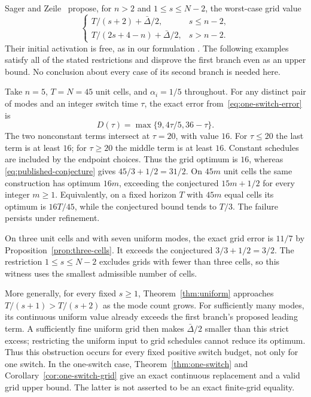 Sager and Zeile~\cite[Conjecture~1, equation~(7.6)]{sager-zeile2021} propose,
for $n>2$ and $1\le s\le N-2$, the worst-case grid value
\begin{equation}\label{eq:published-conjecture}
 \begin{cases}
 T/(s+2)+\bar\Delta/2,&s\le n-2,\\
 T/(2s+4-n)+\bar\Delta/2,&s>n-2.
 \end{cases}
\end{equation}
Their initial activation is free, as in our formulation
\cite[Definition~10]{sager-zeile2021}. The following examples satisfy all
of the stated restrictions and disprove the first branch even as an upper
bound. No conclusion about every case of its second branch is needed here.

\begin{example}\label{ex:five-mode-conjecture}
Take $n=5$, $T=N=45$ unit cells, and $\alpha_i=1/5$ throughout.
For any distinct pair of modes and an integer switch time $\tau$, the exact
error from~\eqref{eq:one-switch-error} is
\[
 D(\tau)=\max\{9,4\tau/5,36-\tau\}.
\]
The two nonconstant terms intersect at $\tau=20$, with value $16$.
For $\tau\le20$ the last term is at least $16$; for $\tau\ge20$ the
middle term is at least $16$. Constant schedules are included by the endpoint
choices. Thus the grid optimum is $16$, whereas
\eqref{eq:published-conjecture} gives $45/3+1/2=31/2$.
On $45m$ unit cells the same construction has optimum $16m$, exceeding the
conjectured $15m+1/2$ for every integer $m\ge1$. Equivalently, on a fixed
horizon $T$ with $45m$ equal cells its optimum is $16T/45$, while the
conjectured bound tends to $T/3$. The failure persists under refinement.
\end{example}

\begin{example}\label{ex:three-cell-conjecture}
On three unit cells and with seven uniform modes, the exact grid error is
$11/7$ by Proposition~\ref{prop:three-cells}. It exceeds the conjectured
$3/3+1/2=3/2$. The restriction $1\le s\le N-2$ excludes grids with fewer
than three cells, so this witness uses the smallest admissible number of
cells.
\end{example}

More generally, for every fixed $s\ge1$, Theorem~\ref{thm:uniform} approaches
$T/(s+1)>T/(s+2)$ as the mode count grows. For sufficiently many modes, its
continuous uniform value already exceeds the first branch's proposed leading
term. A sufficiently fine uniform grid then makes $\bar\Delta/2$ smaller
than this strict excess; restricting the uniform input to grid schedules
cannot reduce its optimum. Thus this obstruction occurs for every fixed
positive switch budget, not only for one switch. In the one-switch case,
Theorem~\ref{thm:one-switch} and Corollary~\ref{cor:one-switch-grid} give an
exact continuous replacement and a valid grid upper bound. The latter is
not asserted to be an exact finite-grid equality.
